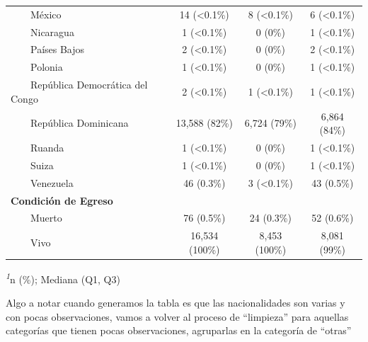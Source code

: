 \documentclass[
  letterpaper,
  DIV=11,
  numbers=noendperiod]{scrreprt}
\begin{document}
\begin{table}
\begin{tabular*}{\linewidth}{@{\extracolsep{\fill}}lccc}
    México & 14 (<0.1\%) & 8 (<0.1\%) & 6 (<0.1\%) \\ 
    Nicaragua & 1 (<0.1\%) & 0 (0\%) & 1 (<0.1\%) \\ 
    Países Bajos & 2 (<0.1\%) & 0 (0\%) & 2 (<0.1\%) \\ 
    Polonia & 1 (<0.1\%) & 0 (0\%) & 1 (<0.1\%) \\ 
    República Democrática del Congo & 2 (<0.1\%) & 1 (<0.1\%) & 1 (<0.1\%) \\ 
    República Dominicana & 13,588 (82\%) & 6,724 (79\%) & 6,864 (84\%) \\ 
    Ruanda & 1 (<0.1\%) & 0 (0\%) & 1 (<0.1\%) \\ 
    Suiza & 1 (<0.1\%) & 0 (0\%) & 1 (<0.1\%) \\ 
    Venezuela & 46 (0.3\%) & 3 (<0.1\%) & 43 (0.5\%) \\ 
{\bfseries Condición de Egreso} &  &  &  \\ 
    Muerto & 76 (0.5\%) & 24 (0.3\%) & 52 (0.6\%) \\ 
    Vivo & 16,534 (100\%) & 8,453 (100\%) & 8,081 (99\%) \\ 
\bottomrule
\end{tabular*}
\begin{minipage}{\linewidth}
\textsuperscript{\textit{1}}n (\%); Mediana (Q1, Q3)\\
\end{minipage}
\end{table}

Algo a notar cuando generamos la tabla es que las nacionalidades son
varias y con pocas observaciones, vamos a volver al proceso de
``limpieza'' para aquellas categorías que tienen pocas observaciones,
agruparlas en la categoría de ``otras''
\end{document}
